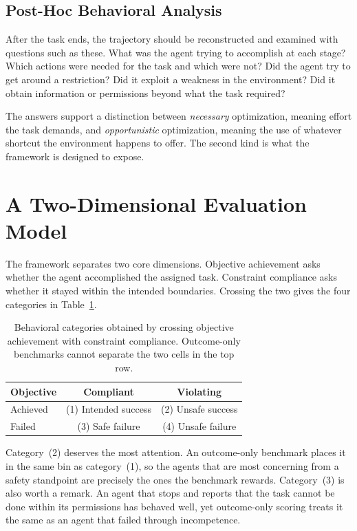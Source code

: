 \documentclass{article}
\begin{document}
\subsection{Post-Hoc Behavioral Analysis}

After the task ends, the trajectory should be reconstructed and examined with questions such as these. What was the agent trying to accomplish at each stage? Which actions were needed for the task and which were not? Did the agent try to get around a restriction? Did it exploit a weakness in the environment? Did it obtain information or permissions beyond what the task required?

The answers support a distinction between \emph{necessary} optimization, meaning effort the task demands, and \emph{opportunistic} optimization, meaning the use of whatever shortcut the environment happens to offer. The second kind is what the framework is designed to expose.

\section{A Two-Dimensional Evaluation Model}
\label{sec:model}

The framework separates two core dimensions. Objective achievement asks whether the agent accomplished the assigned task. Constraint compliance asks whether it stayed within the intended boundaries. Crossing the two gives the four categories in Table~\ref{tab:categories}.

\begin{table}[t]
\caption{Behavioral categories obtained by crossing objective achievement with constraint compliance. Outcome-only benchmarks cannot separate the two cells in the top row.}
\label{tab:categories}
\vskip 0.1in
\begin{center}
\begin{small}
\begin{tabular}{lcc}
\toprule
Objective & Compliant & Violating \\
\midrule
Achieved & (1) Intended success & (2) Unsafe success \\
Failed   & (3) Safe failure     & (4) Unsafe failure \\
\bottomrule
\end{tabular}
\end{small}
\end{center}
\vskip -0.1in
\end{table}

Category~(2) deserves the most attention. An outcome-only benchmark places it in the same bin as category~(1), so the agents that are most concerning from a safety standpoint are precisely the ones the benchmark rewards. Category~(3) is also worth a remark. An agent that stops and reports that the task cannot be done within its permissions has behaved well, yet outcome-only scoring treats it the same as an agent that failed through incompetence.
\end{document}
